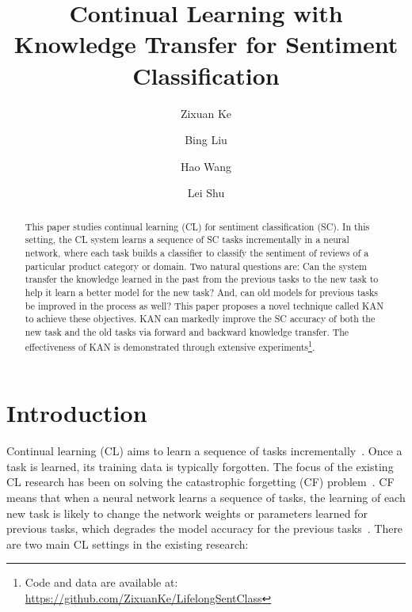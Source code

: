 \documentclass[runningheads]{llncs}
\begin{document}
\title{Continual Learning with Knowledge Transfer for Sentiment Classification}



\author{Zixuan Ke \and
Bing Liu \and
Hao Wang\and
Lei Shu}




\maketitle
\begin{abstract}
This paper studies continual learning (CL) for sentiment classification (SC). In this setting, the CL system learns a sequence of SC tasks incrementally in a neural network, where each task builds a classifier to classify the sentiment of reviews of a particular product category or domain. Two natural questions are: Can the system transfer the knowledge learned in the past from the previous tasks to the new task to help it learn a better model for the new task? And, can old models for previous tasks be improved in the process as well?  This paper proposes a novel technique called KAN to achieve these objectives. KAN can markedly improve the SC accuracy of both the new task and the old tasks via forward and backward knowledge transfer. The effectiveness of KAN is demonstrated through extensive experiments\footnote{Code and data are available at: \url{https://github.com/ZixuanKe/LifelongSentClass}
}. \end{abstract}

\section{Introduction}
\label{sec:introduction}

Continual learning (CL) aims to learn a sequence of tasks incrementally~\cite{chen2018lifelong,Parisi2019continual}. Once a task is learned, its training data is typically forgotten. The focus of the existing CL research has been on solving the catastrophic forgetting (CF) problem~\cite{chen2018lifelong,Parisi2019continual}. CF means that when a neural network learns a sequence of tasks, the learning of each new task is likely to change the network weights or parameters learned for previous tasks, which degrades the model accuracy for the previous tasks~\cite{mccloskey1989catastrophic}. There are two main CL settings in the existing research: 
\end{document}
